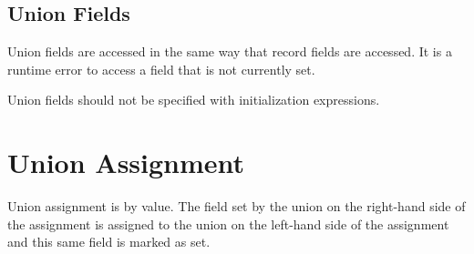 \subsection{Union Fields}
\label{Union_Fields}

Union fields are accessed in the same way that record fields are
accessed.  It is a runtime error to access a field that is not
currently set.

Union fields should not be specified with initialization expressions.

\section{Union Assignment}
\label{Union_Assignment}

Union assignment is by value.  The field set by the union on the
right-hand side of the assignment is assigned to the union on the
left-hand side of the assignment and this same field is marked as set.
